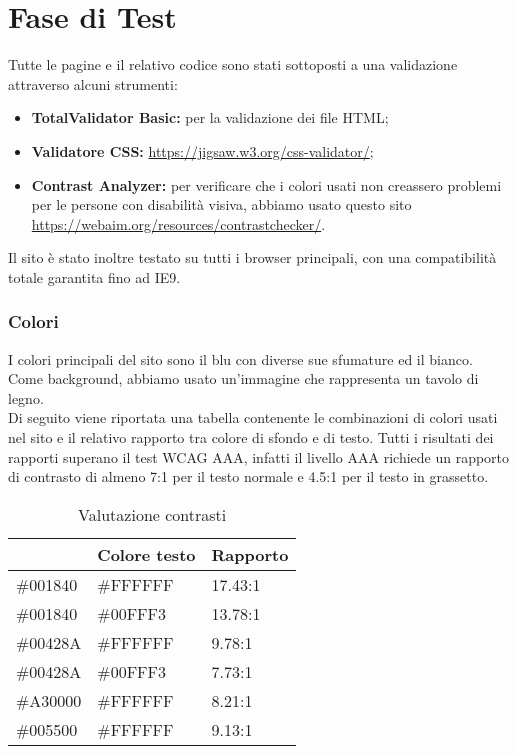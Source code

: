 \section{Fase di Test}
Tutte le pagine e il relativo codice sono stati sottoposti a una validazione attraverso alcuni strumenti:
\begin{itemize}
	\item \textbf{TotalValidator Basic:} per la validazione dei file HTML;
	\item \textbf{Validatore CSS:} \url{https://jigsaw.w3.org/css-validator/};
	\item \textbf{Contrast Analyzer:} per verificare che i colori usati non creassero problemi per le persone con disabilità visiva, abbiamo usato questo sito \url{https://webaim.org/resources/contrastchecker/}.
\end{itemize}
Il sito è stato inoltre testato su tutti i browser principali, con una compatibilità totale garantita fino ad IE9.

\subsubsection{Colori} I colori principali del sito sono il blu con diverse sue sfumature ed il bianco. Come background, abbiamo usato un'immagine che rappresenta un tavolo di legno.\\
Di seguito viene riportata una tabella contenente le combinazioni di colori usati nel sito e il relativo rapporto tra colore di sfondo e di testo. Tutti i risultati dei rapporti superano il test WCAG AAA, infatti il livello AAA richiede un rapporto di contrasto di almeno 7:1 per il testo normale e 4.5:1 per il testo in grassetto.
\begin{center}
	\renewcommand{\arraystretch}{1.8}
	\begin{longtable}[H]{l l l}
		\caption{Valutazione contrasti}\\
		\rowcolor[HTML]{009ABB}
		\multicolumn{1}{c}{\color[HTML]{FFFFFF} \textbf{Colore sfondo}} &
		\multicolumn{1}{c}{\color[HTML]{FFFFFF} \textbf{Colore testo}} &
		\multicolumn{1}{c}{\color[HTML]{FFFFFF} \textbf{Rapporto}} \\
		\endhead
		\#001840 & \#FFFFFF & 17.43:1\\
		\#001840 & \#00FFF3 & 13.78:1\\
		\#00428A & \#FFFFFF & 9.78:1\\
		\#00428A & \#00FFF3 & 7.73:1\\
		\#A30000 & \#FFFFFF & 8.21:1\\
		\#005500 & \#FFFFFF & 9.13:1\\
	\end{longtable}
\end{center}